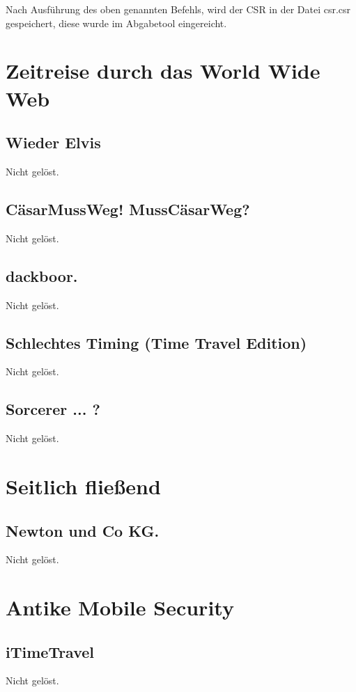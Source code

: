 \documentclass[12pt,a4paper,titlepage,oneside]{scrartcl}
\begin{document}
Nach Ausführung des oben genannten Befehls, wird der CSR in der Datei csr.csr gespeichert, diese wurde im Abgabetool eingereicht.


\section{Zeitreise durch das World Wide Web}

\subsection{Wieder Elvis}
Nicht gelöst.

\subsection{C\"asarMussWeg! MussC\"asarWeg?}
Nicht gelöst.

\subsection{dackboor.}
Nicht gelöst.

\subsection{Schlechtes Timing (Time Travel Edition)}
Nicht gelöst.

\subsection{Sorcerer ... ?}
Nicht gelöst.


\section{Seitlich fließend}

\subsection{Newton und Co KG.}
Nicht gelöst.


\section{Antike Mobile Security}

\subsection{iTimeTravel}
Nicht gelöst.
\end{document}
